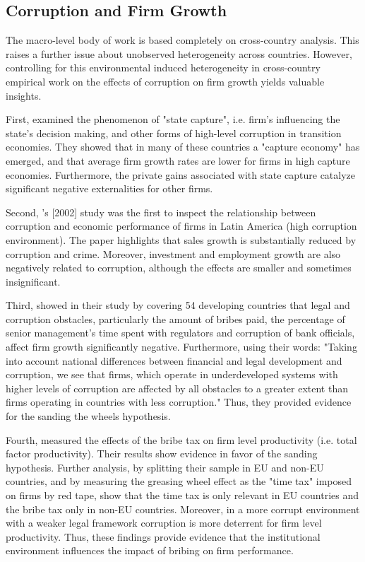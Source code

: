\subsection{Corruption and Firm Growth}
The macro-level body of work is based completely on cross-country analysis. This raises a further issue about unobserved heterogeneity across countries. \citep[p. 64]{fisman2007corruption} However, controlling for this environmental induced heterogeneity in cross-country empirical work on the effects of corruption on firm growth yields valuable insights.   

First, \citet{hellman2000seize} examined the phenomenon of "state capture", i.e. firm's influencing the state's decision making, and other forms of high-level corruption in transition economies. They showed that in many of these countries a "capture economy" has emerged, and that average firm growth rates are lower for firms in high capture economies. Furthermore, the private gains associated with state capture catalyze significant negative externalities for other firms. 

Second, \citeauthor{gaviria2002assessing}'s [2002] study was the first to inspect the relationship between corruption and economic performance of firms in Latin America (high corruption environment). The paper highlights that sales growth is substantially reduced by corruption and crime. Moreover, investment and employment growth are also negatively related to corruption, although the effects are smaller and sometimes insignificant. 

Third, \citet{beck2005financial} showed in their study by covering 54 developing countries that legal and corruption obstacles, particularly the amount of bribes paid, the percentage of senior management's time spent with regulators and corruption of bank officials, affect firm growth significantly negative. Furthermore, using their words: "Taking into account national differences between financial and legal development and corruption, we see that firms, which operate in underdeveloped systems with higher levels of corruption are affected by all obstacles to a greater extent than firms operating in countries with less corruption." \citep[p. 170]{beck2005financial} Thus, they provided evidence for the sanding the wheels hypothesis.

Fourth, \citet{de2010corruption} measured the effects of the bribe tax on firm level productivity (i.e. total factor productivity). Their results show evidence in favor of the sanding hypothesis. Further analysis, by splitting their sample in EU and non-EU countries, and by measuring the greasing wheel effect as the "time tax" imposed on firms by red tape, show that the time tax is only relevant in EU countries and the bribe tax only in non-EU countries. Moreover, in a more corrupt environment with a weaker legal framework corruption is more deterrent for firm level productivity. Thus, these findings provide evidence that the institutional environment influences the impact of bribing on firm performance.

